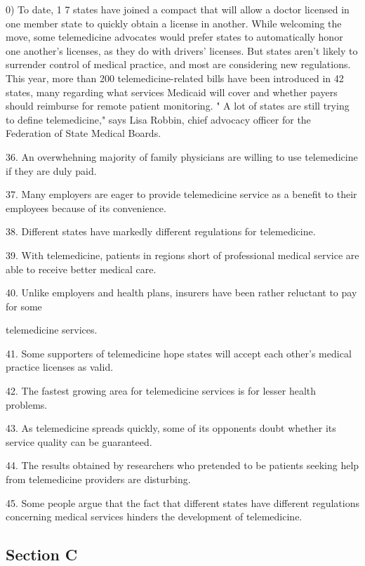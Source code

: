 \documentclass[UTF8,11pt]{ctexart}
\begin{document}
0) To date, 1 7 states have joined a compact that will allow a doctor licensed in one member state to quickly obtain a license in another. While welcoming the move, some telemedicine advocates would prefer states to automatically honor one another's licenses, as they do with drivers' licenses. But states aren't likely to surrender control of medical practice, and most are considering new regulations. This year, more than 200 telemedicine-related bills have been introduced in 42 states, many regarding what services Medicaid will cover and whether payers should reimburse for remote patient monitoring. " A lot of states are still trying to define telemedicine," says Lisa Robbin, chief advocacy officer for the Federation of State Medical Boards.


36. An overwhehning majority of family physicians are willing to use telemedicine if they are duly paid.


37. Many employers are eager to provide telemedicine service as a benefit to their employees because of its convenience.


38. Different states have markedly different regulations for telemedicine.


39. With telemedicine, patients in regions short of professional medical service are able to receive better medical care.


40. Unlike employers and health plans, insurers have been rather reluctant to pay for some


telemedicine services.


41. Some supporters of telemedicine hope states will accept each other's medical practice licenses as valid.


42. The fastest growing area for telemedicine services is for lesser health problems.


43. As telemedicine spreads quickly, some of its opponents doubt whether its service quality can be guaranteed.


44. The results obtained by researchers who pretended to be patients seeking help from telemedicine providers are disturbing.


45. Some people argue that the fact that different states have different regulations concerning medical services hinders the development of telemedicine.


\subsection*{\textbf{Section C}}
\end{document}
